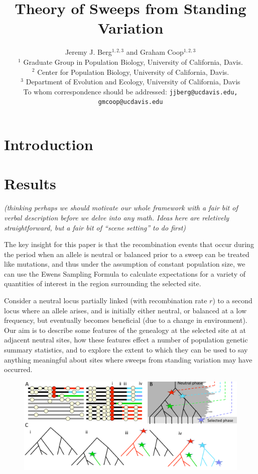 \documentclass[a4paper,10pt]{article}
\title{Theory of Sweeps from Standing Variation}
\author{
Jeremy J. Berg$^{1,2,3}$ and Graham Coop$^{1,2,3}$ \\
$^1$ Graduate Group in Population Biology, University of California, Davis. \\
$^2$ Center for Population Biology, University of California, Davis.\\
$^3$ Department of Evolution and Ecology, University of California, Davis\\
\small To whom correspondence should be addressed: \texttt{jjberg@ucdavis.edu, gmcoop@ucdavis.edu}\\
}
\date{}
\newcommand{\jb}[1]{{\it\color{blue} (#1)} }
\begin{document}
\maketitle

\begin{abstract}
\end{abstract}

\section{Introduction}



\section{Results}
\jb{thinking perhaps we should motivate our whole framework with a fair bit of verbal description before we delve into any math. Ideas here are reletively straightforward, but a fair bit of ``scene setting'' to do first}

The key insight for this paper is that the recombination events that occur during the period when an allele is neutral or balanced prior to a sweep can be treated like mutations, and thus under the assumption of constant population size, we can use the Ewens Sampling Formula to calculate expectations for a variety of quantities of interest in the region surrounding the selected site.

Consider a neutral locus partially linked (with recombination rate $r$) to a second locus where an allele arises, and is initially either neutral, or balanced at a low frequency, but eventually becomes beneficial (due to a change in environment). Our aim is to describe some features of the genealogy at the selected site at at adjacent neutral sites, how these features effect a number of population genetic summary statistics, and to explore the extent to which they can be used to say anything meaningful about sites where sweeps from standing variation may have occurred. 

\begin{figure}
\includegraphics[width = 0.8
          \textwidth]{Paper_Figures/Cartoon_of_soft_sweeps.pdf}
\end{figure}
\end{document}
